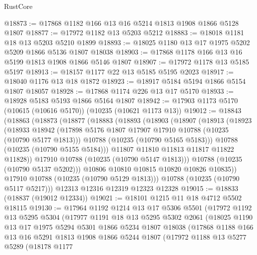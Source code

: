 \begin{lexlean}{RustCore}
\begin{coremodule}
@18873 := @17868 @1182 @166 @13 @16 @5214 @1813 @1908 @1866 @5128 @1807
@18877 := @17972 @1182 @13 @5203 @5212
@18883 := @18018 @1181 @18 @13 @5203 @5210 @1899
@18893 := @18025 @1180 @13 @17 @1975 @5202 @5209 @1866 @5136 @1807 @18038
@18903 := @17868 @1178 @166 @13 @16 @5199 @1813 @1908 @1866 @5146 @1807
@18907 := @17972 @1178 @13 @5185 @5197
@18913 := @18157 @1177 @22 @13 @5185 @5195 @2023
@18917 := @18040 @1176 @13 @18 @1872
@18923 := @18917 @5184 @5194 @1866 @5154 @1807 @18057
@18928 := @17868 @1174 @226 @13 @17 @5170
@18933 := @18928 @5183 @5193 @1866 @5164 @1807
@18942 := @17903 @1173 @5170 (@10615 (@10616 @5170)) (@10235 (@10621 @1173 @13))
@19012 := @18843
    (@18863
      (@18873
        (@18877
          (@18883
            (@18893
              (@18903
                (@18907
                  (@18913
                    (@18923
                      (@18933
                        @18942
                        (@17898 @5176 @1807 @17907 @17910 @10788 (@10235 (@10790 @5177 @1813)))
                        @10788
                        (@10235 (@10790 @5165 @5183)))
                      @10788
                      (@10235 (@10790 @5155 @5184)))
                    @11807
                    @11810
                    @11813
                    @11817
                    @11822
                    @11828))
                @17910
                @10788
                (@10235 (@10790 @5147 @1813)))
              @10788
              (@10235 (@10790 @5137 @5202)))
            @10806
            @10810
            @10815
            @10820
            @10826
            @10835))
        @17910
        @10788
        (@10235 (@10790 @5129 @1813)))
      @10788
      (@10235 (@10790 @5117 @5217)))
    @12313
    @12316
    @12319
    @12323
    @12328
@19015 := @18833 (@18837 (@19012 @12334))
@19021 := @18101 @1215 @11 @18 @4712 @5502 @18115
@19130 := @17964
    @1192
    @1214
    @13
    @17
    @5306
    @5501
    (@17972
      @1192
      @13
      @5295
      @5304
      (@17977
        @1191
        @18
        @13
        @5295
        @5302
        @2061
        (@18025
          @1190
          @13
          @17
          @1975
          @5294
          @5301
          @1866
          @5234
          @1807
          @18038
          (@17868
            @1188
            @166
            @13
            @16
            @5291
            @1813
            @1908
            @1866
            @5244
            @1807
            (@17972
              @1188
              @13
              @5277
              @5289
              (@18178
                @1177

\end{coremodule}
\end{lexlean}
